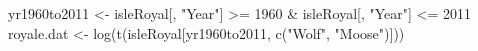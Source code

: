 \begin{Schunk}
\begin{Sinput}
 yr1960to2011 <- isleRoyal[, "Year"] >= 1960 & isleRoyal[, "Year"] <= 2011
 royale.dat <- log(t(isleRoyal[yr1960to2011, c("Wolf", "Moose")]))
\end{Sinput}
\end{Schunk}
